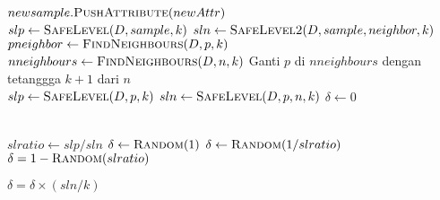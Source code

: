 \begin{center}
\begin{algorithmic}[1]
		\State $ newsample.\Call{PushAttribute}{newAttr} $
	\EndFor
	\State {}
\EndFunction
\\
	\State $ slp \gets \Call{SafeLevel}{D, sample, k} $
	\State $ sln \gets \Call{SafeLevel2}{D, sample, neighbor, k} $
	\State {}
\EndFunction
\\
	\State $ pneighbor \gets \Call{FindNeighbours}{ D, p, k } $
	\State {}
\EndFunction
\\
	\State $ nneighbours \gets \Call{FindNeighbours}{ D, n, k } $
		\State Ganti $ p $ di $ nneighbours $ dengan tetanggga $ k + 1 $
		dari $ n $
	\EndIf
	\State {}
\EndFunction
\\
	\State $ slp \gets \Call{SafeLevel}{D, p, k} $
	\State $ sln \gets \Call{SafeLevel}{D, p, n, k} $
	\State $ \delta \gets 0 $

		\State \Return{$ \delta $}
	\EndIf
	\\
	\State $ slratio \gets slp / sln $
		\State $ \delta \gets \Call{Random}{1} $
		\State $ \delta \gets \Call{Random}{1 / slratio} $
	\Else
		\State $ \delta = 1 - \Call{Random}{slratio} $
	\EndIf

		\State $ \delta = \delta \times (sln / k) $
	\EndIf
	\State \Return{$ \delta $}
\EndFunction
	\end{algorithmic}
\end{center}
